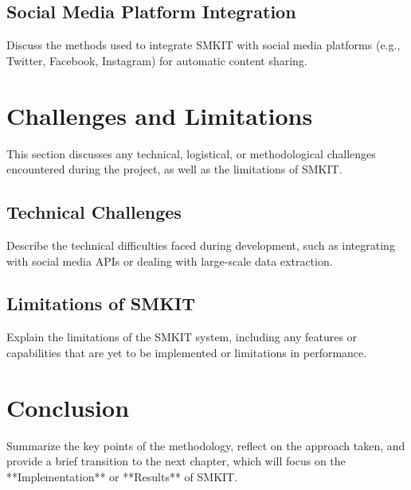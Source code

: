 \subsection{Social Media Platform Integration}
\label{subsec:social_media_integration}
Discuss the methods used to integrate SMKIT with social media platforms (e.g., Twitter, Facebook, Instagram) for automatic content sharing.

\section{Challenges and Limitations}
\label{sec:challenges_limitations}
This section discusses any technical, logistical, or methodological challenges encountered during the project, as well as the limitations of SMKIT.

\subsection{Technical Challenges}
\label{subsec:technical_challenges}
Describe the technical difficulties faced during development, such as integrating with social media APIs or dealing with large-scale data extraction.

\subsection{Limitations of SMKIT}
\label{subsec:limitations_of_smkit}
Explain the limitations of the SMKIT system, including any features or capabilities that are yet to be implemented or limitations in performance.

\section{Conclusion}
\label{sec:methodology_conclusion}
Summarize the key points of the methodology, reflect on the approach taken, and provide a brief transition to the next chapter, which will focus on the **Implementation** or **Results** of SMKIT.
